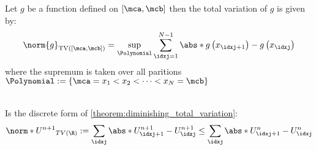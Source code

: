 \begin{defnbox}\nospacing
    \begin{defn}\label{defn:discrete_total_variation}
        Let $g$ be a function defined on $[\mca,\mcb]$ then the total variation of $g$ is given by:
        \begin{align}
          \norm{g}_{\text{TV}([\mca,\mcb])}=\sup_{\Polynomial}\sum_{\idxj=1}^{N-1}\abs*{g\left(x_{\idxj+1}\right)-g\left(x_{\idxj}\right)}
        \end{align}
        where the supremum is taken over all paritions $\Polynomial:=\left\{\mca=x_{1}<x_{2}<\cdots<x_{N}=\mcb\right\}$
    \end{defn}
\end{defnbox}
\begin{defnbox}\nospacing
    \begin{defn}\label{defn:discrete_total_variation_diminishing}\leavevmode\\
        Is the discrete form of \cref{theorem:diminishing_total_variation}:
        \begin{align}
          \norm*{U^{n+1}}_{TV(\R)}:=\sum_{\idxj}\abs*{U_{\idxj+1}^{n+1}-U_{\idxj}^{n+1}}\leq \sum_{\idxj}\abs*{U_{\idxj+1}^{n}-U_{\idxj}^{n}}\label{eq:discrete_total_variation_diminishing}
        \end{align}
    \end{defn}
\end{defnbox}



